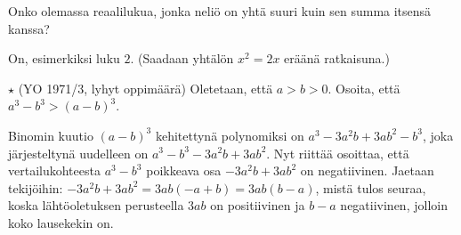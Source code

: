 \begin{tehtavasivu}
\begin{tehtava}
Onko olemassa reaalilukua, jonka neliö on yhtä suuri kuin sen summa itsensä kanssa?
	\begin{vastaus}
On, esimerkiksi luku $2$. (Saadaan yhtälön $x^2=2x$ eräänä ratkaisuna.)
	\end{vastaus}
\end{tehtava}

\begin{tehtava}
$\star$ (YO 1971/3, lyhyt oppimäärä) Oletetaan, että $a>b>0$. Osoita, että $a^3-b^3>(a-b)^3$.
	\begin{vastaus}
	Binomin kuutio $(a-b)^3$ kehitettynä polynomiksi on $a^3-3a^2b+3ab^2-b^3$, joka järjesteltynä uudelleen on $a^3-b^3-3a^2b+3ab^2$. Nyt riittää osoittaa, että vertailukohteesta $a^3-b^3$ poikkeava osa $-3a^2b+3ab^2$ on negatiivinen. Jaetaan tekijöihin: $-3a^2b+3ab^2=3ab(-a+b)=3ab(b-a)$, mistä tulos seuraa, koska lähtöoletuksen perusteella $3ab$ on positiivinen ja $b-a$ negatiivinen, jolloin koko lausekekin on.  
	\end{vastaus}
\end{tehtava}


\end{tehtavasivu}